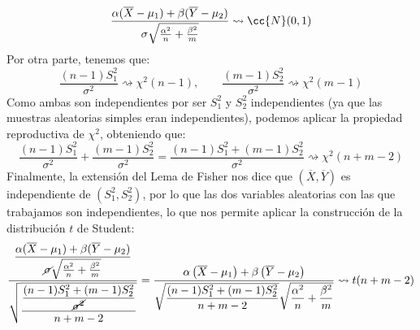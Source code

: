 \begin{ejercicio}
\begin{equation*}
        \dfrac{\alpha(\overline{X}-\mu_1 ) +\beta(\overline{Y}-\mu_2) }{\sigma\sqrt{\frac{\alpha^2}{n}+\frac{\beta^2}{m}}} \rightsquigarrow\cc{N}(0,1)
    \end{equation*}
    Por otra parte, tenemos que:
    \begin{equation*}
        \dfrac{(n-1)S_1^2}{\sigma^2} \rightsquigarrow\chi^2(n-1), \qquad 
        \dfrac{(m-1)S_2^2}{\sigma^2} \rightsquigarrow\chi^2(m-1) 
    \end{equation*}
    Como ambas son independientes por ser $S_1^2$ y $S_2^2$ independientes (ya que las muestras aleatorias simples eran independientes), podemos aplicar la propiedad reproductiva de $\chi^2$, obteniendo que:
    \begin{equation*}
        \dfrac{(n-1)S_1^2}{\sigma^2} + \dfrac{(m-1)S_2^2}{\sigma^2} = \dfrac{(n-1)S_1^2+(m-1)S_2^2}{\sigma^2}\rightsquigarrow\chi^2(n+m-2) 
    \end{equation*}
    Finalmente, la extensión del Lema de Fisher nos dice que $(\overline{X},\overline{Y})$ es independiente de $(S_1^2, S_2^2)$, por lo que las dos variables aleatorias con las que trabajamos son independientes, lo que nos permite aplicar la construcción de la distribución $t$ de Student:
    \begin{equation*}
        \dfrac{\dfrac{\alpha(\overline{X}-\mu_1 ) +\beta(\overline{Y}-\mu_2) }{\cancel{\sigma}\sqrt{\frac{\alpha^2}{n}+\frac{\beta^2}{m}}}}{\sqrt{\dfrac{\dfrac{(n-1)S_1^2+(m-1)S_2^2}{\cancel{\sigma^2}}}{n+m-2}}} = \dfrac{\alpha\left(\overline{X}-\mu_1\right)+\beta\left(\overline{Y}-\mu_2\right)}{\sqrt{\dfrac{(n-1)S_1^2 + (m-1)S_2^2}{n+m-2}} \sqrt{\dfrac{\alpha^2}{n} + \dfrac{\beta^2}{m}}} \rightsquigarrow t(n+m-2)
    \end{equation*}
\end{ejercicio}


